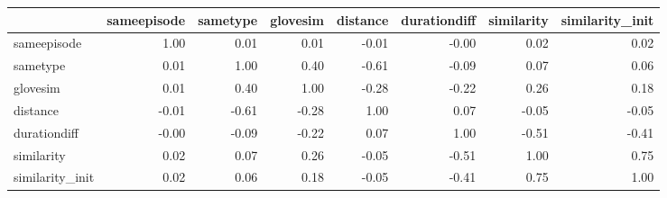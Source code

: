 \begin{tabular}{lrrrrrrr}
\toprule
{} &  sameepisode &  sametype &  glovesim &  distance &  durationdiff &  similarity &  similarity\_init \\
\midrule
sameepisode     &         1.00 &      0.01 &      0.01 &     -0.01 &         -0.00 &        0.02 &             0.02 \\
sametype        &         0.01 &      1.00 &      0.40 &     -0.61 &         -0.09 &        0.07 &             0.06 \\
glovesim        &         0.01 &      0.40 &      1.00 &     -0.28 &         -0.22 &        0.26 &             0.18 \\
distance        &        -0.01 &     -0.61 &     -0.28 &      1.00 &          0.07 &       -0.05 &            -0.05 \\
durationdiff    &        -0.00 &     -0.09 &     -0.22 &      0.07 &          1.00 &       -0.51 &            -0.41 \\
similarity      &         0.02 &      0.07 &      0.26 &     -0.05 &         -0.51 &        1.00 &             0.75 \\
similarity\_init &         0.02 &      0.06 &      0.18 &     -0.05 &         -0.41 &        0.75 &             1.00 \\
\bottomrule
\end{tabular}
